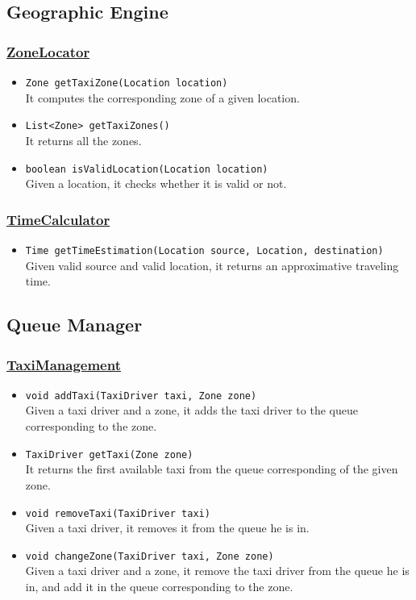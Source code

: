 \subsection{Geographic Engine}
\subsubsection{\underline{ZoneLocator}}
\begin{itemize}
	\item \texttt{Zone getTaxiZone(Location location)}\\
	It computes the corresponding zone of a given location.
	\item \texttt{List<Zone> getTaxiZones()}\\
	It returns all the zones.
	\item \texttt{boolean isValidLocation(Location location)}\\
	Given a location, it checks whether it is valid or not.
\end{itemize}
\subsubsection{\underline{TimeCalculator}}
\begin{itemize}
	\item \texttt{Time getTimeEstimation(Location source, Location, destination)}\\
	Given valid source and valid location, it returns an approximative traveling time.
\end{itemize}
\subsection{Queue Manager}
\subsubsection{\underline{TaxiManagement}}
\begin{itemize}
	\item \texttt{void addTaxi(TaxiDriver taxi, Zone zone)}\\
	Given a taxi driver and a zone, it adds the taxi driver to the queue corresponding to the zone.
	\item \texttt{TaxiDriver getTaxi(Zone zone)}\\
	It returns the first available taxi from the queue corresponding of the given zone.
	\item \texttt{void removeTaxi(TaxiDriver taxi)}\\
	Given a taxi driver, it removes it from the queue he is in.
	\item \texttt{void changeZone(TaxiDriver taxi, Zone zone)}\\
	Given a taxi driver and a zone, it remove the taxi driver from the queue he is in, and add it in the queue corresponding to the zone.
\end{itemize}